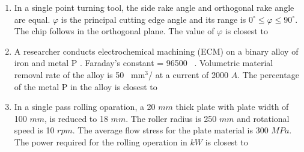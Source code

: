 \documentclass[journal]{IEEEtran}
\numberwithin{equation}{enumi}
\numberwithin{figure}{enumi}
\begin{document}
\begin{enumerate}
\begin{enumerate}
\end{enumerate}
\item In a single point turning tool, the side rake angle and orthogonal rake angle are equal. $\varphi$ is the principal cutting edge angle and its range is $0^{\circ}\leq\varphi\leq90^{\circ}$. The chip follows in the orthogonal plane. The value of $\varphi$ is closest to
\hfill{}
\begin{enumerate}
   
\end{enumerate}
\item A researcher conducts electrochemical machining (ECM) on a binary alloy of iron  and metal P . Faraday's constant = 96500 \, . Volumetric material removal rate of the alloy is 50 \, $\text{mm}^3$/ at a current of 2000 $A$. The percentage of the metal P in the alloy is closest to
\hfill{}
\begin{enumerate}
\end{enumerate}
\item In a single pass rolling oparation, a 20 $mm$ thick plate with plate width of 100 $mm$, is reduced to 18 $mm$. The roller radius is 250 $mm$ and rotational speed is 10 $rpm$. The average flow stress for the plate material is 300 $MPa$. The power required for the rolling  operation in $kW$ is closest to 
\hfill{}
\begin{enumerate}
    


\end{enumerate}
\end{enumerate}
\end{document}
